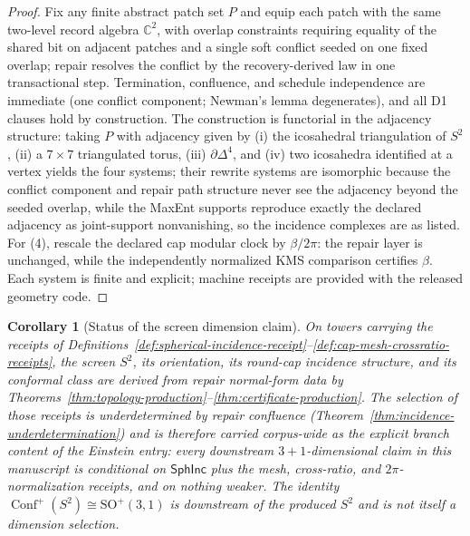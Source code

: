 \documentclass[11pt]{article}
\newtheorem{corollary}[theorem]{Corollary}
\begin{document}
\begin{proof}
Fix any finite abstract patch set \(P\) and equip each patch with the same
two-level record algebra \(\mathbb C^2\), with overlap constraints requiring
equality of the shared bit on adjacent patches and a single soft conflict
seeded on one fixed overlap; repair resolves the conflict by the
recovery-derived law in one transactional step. Termination, confluence, and
schedule independence are immediate (one conflict component; Newman's lemma
degenerates), and all D1 clauses hold by construction. The construction is
functorial in the adjacency structure: taking \(P\) with adjacency given by
(i) the icosahedral triangulation of \(S^2\), (ii) a \(7\times7\) triangulated
torus, (iii) \(\partial\Delta^4\), and (iv) two icosahedra identified at a
vertex yields the four systems; their rewrite systems are isomorphic because
the conflict component and repair path structure never see the adjacency
beyond the seeded overlap, while the MaxEnt supports reproduce exactly the
declared adjacency as joint-support nonvanishing, so the incidence complexes
are as listed. For (4), rescale the declared cap modular clock by
\(\beta/2\pi\): the repair layer is unchanged, while the independently
normalized KMS comparison certifies \(\beta\). Each system is finite and
explicit; machine receipts are provided with the released geometry code.
\end{proof}

\begin{corollary}[Status of the screen dimension claim]
\label{cor:dimension-selection-status}
On towers carrying the receipts of
Definitions~\ref{def:spherical-incidence-receipt}--\ref{def:cap-mesh-crossratio-receipts},
the screen \(S^2\), its orientation, its round-cap incidence structure, and
its conformal class are \emph{derived} from repair normal-form data by
Theorems~\ref{thm:topology-production}--\ref{thm:certificate-production}. The
selection of those receipts is \emph{underdetermined} by repair confluence
(Theorem~\ref{thm:incidence-underdetermination}) and is therefore carried
corpus-wide as the explicit branch content of the Einstein entry: every
downstream \(3+1\)-dimensional claim in this manuscript is conditional on
\(\mathsf{SphInc}\) plus the mesh, cross-ratio, and \(2\pi\)-normalization
receipts, and on nothing weaker. The identity
\(\operatorname{Conf}^+(S^2)\cong\mathrm{SO}^+(3,1)\) is downstream of the
produced \(S^2\) and is not itself a dimension selection.
\end{corollary}
\end{document}
